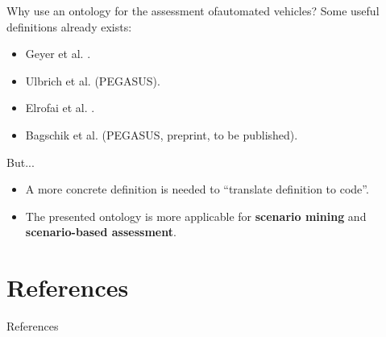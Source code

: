 \documentclass[aspectratio=\AspectR,10pt,compress,t]{beamer} %
\begin{document}
\begin{frame}{Why use an ontology for the assessment of}{automated vehicles?}
	Some useful definitions already exists:
	\begin{itemize}
		\item Geyer et al. \cite{geyer2014}.
		\item Ulbrich et al. \cite{ulbrich2015} (PEGASUS).
		\item Elrofai et al. \cite{elrofai2016scenario}.
		\item Bagschik et al. \cite{bagschik2017ontology} (PEGASUS, preprint, to be published).
	\end{itemize}
	But...
	\begin{itemize}
		\item A more concrete definition is needed to ``translate definition to code''.
		\item The presented ontology is more applicable for \textbf{scenario mining} and \textbf{scenario-based assessment}.
	\end{itemize}
\end{frame}

\section{References}
\begin{frame}{References}
\end{frame}

\begin{frame}[allowframebreaks]
	\scriptsize{}
	
\end{frame}
\end{document}
